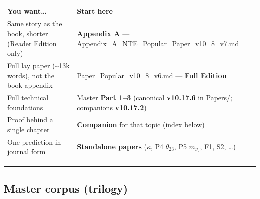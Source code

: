 \documentclass[
  11pt,
]{article}
\newcounter{none} %
\begin{document}
{\def\LTcaptype{none} %
\begin{longtable}[]{@{}
  >{\raggedright\arraybackslash}p{}
  >{\raggedright\arraybackslash}p{}@{}}
\toprule\noalign{}
\begin{minipage}[b]{\linewidth}\raggedright
You want\ldots{}
\end{minipage} & \begin{minipage}[b]{\linewidth}\raggedright
Start here
\end{minipage} \\
\midrule\noalign{}
\endhead
\bottomrule\noalign{}
\endlastfoot
Same story as the book, shorter (Reader Edition only) & \textbf{Appendix
A} ---
Appendix\_\allowbreak{}A\_\allowbreak{}NTE\_\allowbreak{}Popular\_\allowbreak{}Paper\_\allowbreak{}v10\_\allowbreak{}8\_\allowbreak{}v7.md \\
Full lay paper (\textasciitilde13k words), not the book appendix &
Paper\_\allowbreak{}Popular\_\allowbreak{}v10\_\allowbreak{}8\_\allowbreak{}v6.md
--- \textbf{Full Edition} \\
Full technical foundations & Master \textbf{Part 1--3} (canonical
\textbf{v10.17.6} in Papers/\allowbreak{}; companions
\textbf{v10.17.2}) \\
Proof behind a single chapter & \textbf{Companion} for that topic (index
below) \\
One prediction in journal form & \textbf{Standalone papers} (\(\kappa\),
P4 \(\theta_{23}\), P5 \(m_{\nu_2}\), F1, S2, \ldots) \\
\end{longtable}
}

\begin{center}\rule{0.5\linewidth}{0.5pt}\end{center}

\subsection{Master corpus (trilogy)}\label{master-corpus-trilogy}
\end{document}
